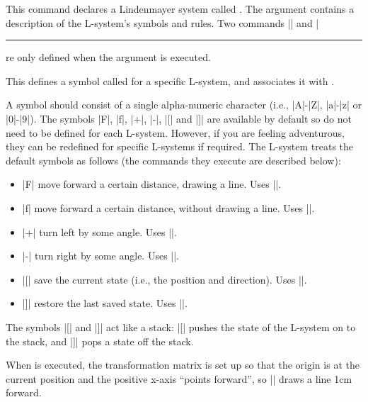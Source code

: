 \begin{command}{\pgfdeclarelindenmayersystem{}}

This command declares a Lindenmayer system called .
The  argument contains a description of the
L-system's symbols and rules. Two commands |\symbol| and |\rule| are
only defined when the  argument is executed.

\begin{command}{\symbol{}}
  This defines a symbol called  for a specific L-system,
  and associates it with .

  A symbol should consist of a single
  alpha-numeric character (i.e., |A|-|Z|, |a|-|z| or |0|-|9|).
  The symbols
  |F|, |f|, |+|, |-|, |[| and |]| are available by default so do
  not need to be defined for each L-system. However, if you are
  feeling adventurous, they can be redefined for specific L-systems
  if required. The L-system treats the default symbols as follows
  (the commands they execute are described below):

  \begin{itemize}
  	\item
  	|F| move forward a certain distance, drawing a line. Uses
  	|\pgflsystemdrawforward|.
  	
  	\item
  	|f| move forward a certain distance, without drawing a line.
  	Uses |\pgflsystemmoveforward|.
  	
  	\item
  	|+| turn left by some angle.
  	Uses |\pgflsystemturnleft|.
  	
  	\item
  	|-| turn right by some angle.
  	Uses |\pgflsystemturnright|.
  	
  	\item
  	|[| save the current state (i.e., the position and direction).
  	Uses |\pgflsystemsavestate|.
  	
  	\item
  	|]| restore the last saved state.
  	Uses |\pgflsystemrestorestate|.
  	
  \end{itemize}

  The symbols |[| and |]| act like a stack: |[| pushes the state of the
  L-system on to the stack, and |]| pops a state off the stack.

   When  is executed, the transformation matrix is set up
  so that the origin is at the current position and the positive
  x-axis ``points forward'', so |\pgfpathlineto{\pgfpoint{1cm}{0cm}}|
  draws a line 1cm forward.


\end{command}
\end{command}

